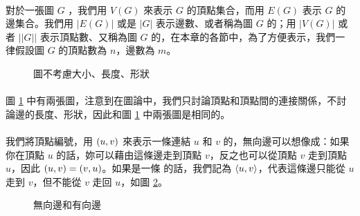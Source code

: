 \documentclass[12pt,a4paper,oneside]{report}
\begin{document}
\begin{CJK}{UTF8}{bkai}
\paragraph{}對於一張圖 $G$ ，我們用 $V(G)$ 來表示 $G$ 的頂點集合，而用 $E(G)$ 表示 $G$ 的邊集合。我們用 $|E(G)|$ 或是 $|G|$ 表示邊數、或者稱為圖 $G$ 的；用 $|V(G)|$ 或者 $||G||$ 表示頂點數、又稱為圖 $G$ 的，在本章的各節中，為了方便表示，我們一律假設圖 $G$ 的頂點數為 $n$，邊數為 $m$。
\begin{figure}[h!]
\centering
{}
\caption{圖不考慮大小、長度、形狀}
\label{fig:a_graph}
\end{figure}

\paragraph{}圖 \ref{fig:a_graph} 中有兩張圖，注意到在圖論中，我們只討論頂點和頂點間的連接關係，不討論邊的長度、形狀，因此和圖 \ref{fig:a_graph} 中兩張圖是相同的。
\paragraph{}我們將頂點編號，用 $({u},{v})$ 來表示一條連結 $u$ 和 $v$ 的\textbf{}，無向邊可以想像成：如果你在頂點 $u$ 的話，妳可以藉由這條邊走到頂點 $v$，反之也可以從頂點 $v$ 走到頂點 $u$，因此 $({u},{v})=({v},{u})$。如果是一條\textbf{} 的話，我們記為 $\langle{}{{u},{v}}\rangle{}$，代表這條邊只能從 $u$ 走到 $v$，但不能從 $v$ 走回 $u$，如圖 \ref{fig:edge_arc}。
\begin{figure}[h!]
\centering
{}
\caption{無向邊和有向邊}
\label{fig:edge_arc}
\end{figure}

\end{CJK}
\end{document}
